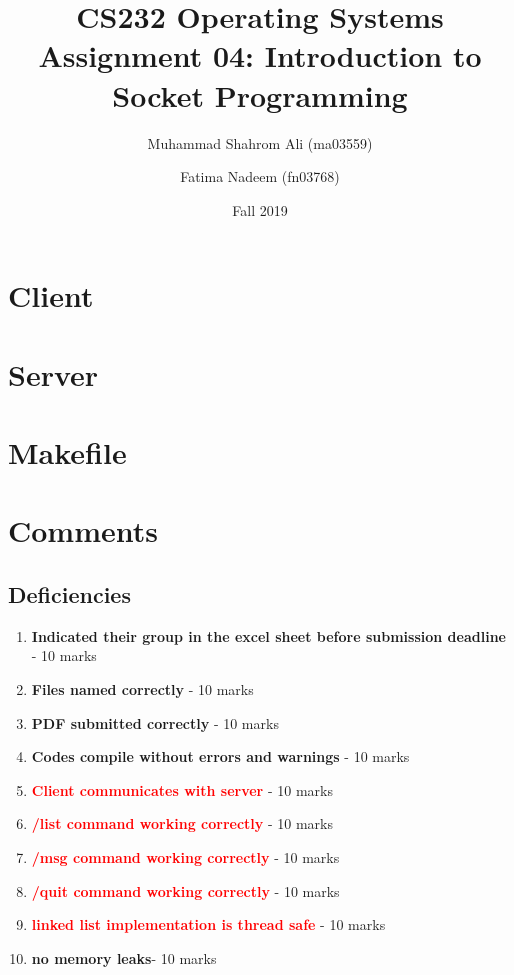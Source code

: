 \documentclass[a4paper]{article}
\newcommand\complete[1]{\textcolor{OliveGreen}{\textbf{#1}}}
\newcommand\pending[1]{\textcolor{red}{\textbf{#1}}}
\begin{document}
\title{CS232 Operating Systems \\ Assignment 04: Introduction to Socket Programming}
\author{Muhammad Shahrom Ali (ma03559) \and Fatima Nadeem (fn03768)}
\date{Fall 2019}

\maketitle


\section {Client}
\clearpage
\section {Server}
\clearpage
\section {Makefile}



\clearpage
\section {Comments}
    \subsection{Deficiencies}
        \begin{enumerate}
            \item \complete{ Indicated their group in the excel sheet before submission deadline} - 10 marks
            \item \complete{ Files named correctly} - 10 marks
            \item \complete{ PDF submitted correctly} - 10 marks
            \item \complete{ Codes compile without errors and warnings} - 10 marks
            \item \pending{ Client communicates with server} - 10 marks
            \item \pending{ /list command working correctly} - 10 marks
            \item \pending{ /msg command working correctly} - 10 marks
            \item \pending{ /quit command working correctly} - 10 marks
            \item \pending{ linked list implementation is thread safe} - 10 marks
            \item \complete{ no memory leaks}- 10 marks
        \end{enumerate}
\end{document}
